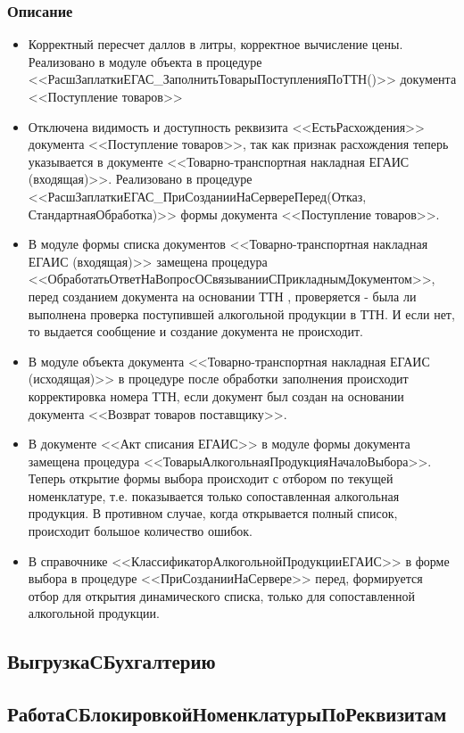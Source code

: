 \subsubsection{Описание}
\begin{itemize}[label={--}]	
	\item Корректный пересчет даллов в литры, корректное вычисление цены. Реализовано в модуле объекта в процедуре <<РасшЗаплаткиЕГАС\_ЗаполнитьТоварыПоступленияПоТТН()>> документа <<Поступление товаров>>
	\item Отключена видимость и доступность реквизита <<ЕстьРасхождения>>  документа <<Поступление товаров>>, так как признак расхождения теперь указывается в документе <<Товарно-транспортная накладная ЕГАИС (входящая)>>. Реализовано в процедуре <<РасшЗаплаткиЕГАС\_ПриСозданииНаСервереПеред(Отказ, СтандартнаяОбработка)>> формы документа <<Поступление товаров>>.
	\item В модуле формы списка документов <<Товарно-транспортная накладная ЕГАИС (входящая)>> замещена процедура <<ОбработатьОтветНаВопросОСвязыванииСПрикладнымДокументом>>, 	перед созданием документа на основании ТТН , проверяется - была ли выполнена проверка поступившей алкогольной продукции в ТТН. И если нет, то выдается сообщение и создание документа не происходит.
	\item В модуле объекта документа <<Товарно-транспортная накладная ЕГАИС (исходящая)>> в процедуре после обработки заполнения происходит корректировка номера ТТН, если документ был создан на основании документа <<Возврат товаров поставщику>>. 	
	\item В документе <<Акт списания ЕГАИС>> в модуле формы документа замещена процедура <<ТоварыАлкогольнаяПродукцияНачалоВыбора>>. Теперь открытие формы выбора происходит с отбором по текущей номенклатуре, т.е. показывается только сопоставленная алкогольная продукция. В противном случае, когда открывается полный список, происходит большое количество ошибок.	
	\item В справочнике <<КлассификаторАлкогольнойПродукцииЕГАИС>> в форме выбора в процедуре <<ПриСозданииНаСервере>> перед, формируется отбор для открытия динамического списка, только для сопоставленной алкогольной продукции.
\end{itemize}
\subsection{ВыгрузкаСБухгалтерию}\label{502}
\subsection{РаботаСБлокировкойНоменклатурыПоРеквизитам}\label{503}
